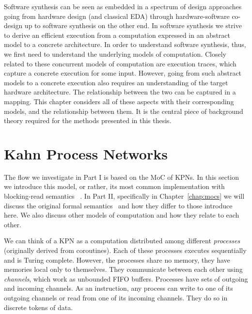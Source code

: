Software synthesis can be seen as embedded in a spectrum of design approaches going from hardware design (and classical \ac{EDA}) through hardware-software co-design up to software synthesis on the other end. 
In software synthesis we strive to derive an efficient execution from a computation expressed in an abstract model to a concrete architecture.
In order to understand software synthesis, thus, we first need to understand the underlying models of computation.
Closely related to these concurrent models of computation are execution traces, which capture a concrete execution for some input.
However, going from such abstract models to a concrete execution also requires an understanding of the target hardware architecture.
The relationship between the two can be captured in a mapping.
This chapter considers all of these aspects with their corresponding models, and the relationship between them.
It is the central piece of background theory required for the methods presented in this thesis.

\section{Kahn Process Networks}
\label{sec:kpn_basic}

The flow we investigate in Part I is based on the \ac{MoC} of \acfp{KPN}.
In this section we introduce this model, or rather, its most common implementation with blocking-read semantics~\cite{kahn_macqueen} .
In Part II, specifically in Chapter~\ref{chap:mocs} we will discuss the original formal semantics~\cite{kahn74} and how they differ to those introduce here.
We also discuss other models of computation and how they relate to each other.

We can think of a \ac{KPN} as a computation distributed among different \emph{processes} (originally derived from coroutines).
Each of these processes executes sequentially and is Turing complete. However, the processes share no memory, they have memories local only to themselves.
They communicate between each other using \emph{channels}, which work as unbounded \acs{FIFO} buffers. 
Processes have sets of outgoing and incoming channels.
As an instruction, any process can write to one of its outgoing channels or read from one of its incoming channels.
They do so in discrete tokens of data.

